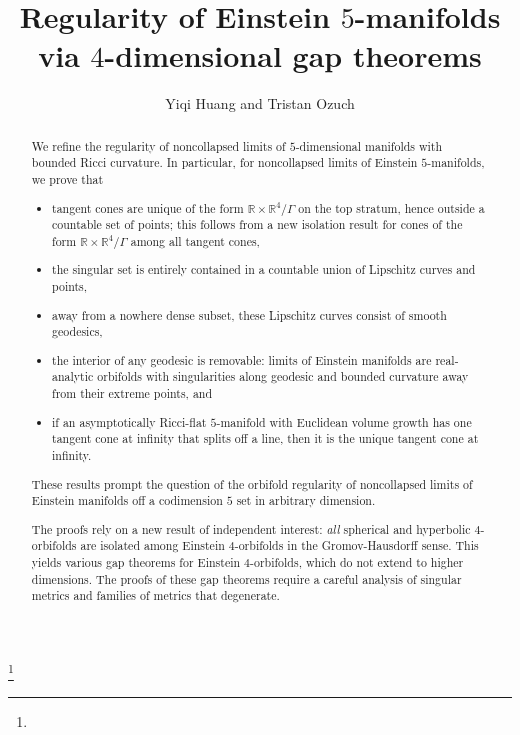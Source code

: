 \documentclass[11pt,reqno]{amsart}
\numberwithin{equation}{section}
\theoremstyle{definition}
\theoremstyle{remark}
\begin{document}
\thanks{}

\title[]{Regularity of Einstein $5$-manifolds via $4$-dimensional gap theorems}



\author{Yiqi Huang and Tristan Ozuch}
\address{Department of Mathematics, MIT, 77 Massachusetts Avenue, Cambridge, MA 02139-4307, USA}






\vspace{-0.3cm}
        


\begin{abstract}
    We refine the regularity of noncollapsed limits of $5$-dimensional manifolds with bounded Ricci curvature. In particular, for noncollapsed limits of Einstein $5$-manifolds, we prove that
    \begin{itemize}
        \item tangent cones are unique of the form $\mathbb{R}\times\mathbb{R}^4/\Gamma$ on the top stratum, hence outside a countable set of points; this follows from a new isolation result for cones of the form $\mathbb{R}\times\mathbb{R}^4/\Gamma$ among all tangent cones,
        \item the singular set is entirely contained in a countable union of Lipschitz curves and points,
        \item away from a nowhere dense subset, these Lipschitz curves consist of smooth geodesics,
        \item the interior of any geodesic is removable: limits of Einstein manifolds are real-analytic orbifolds with singularities along geodesic and bounded curvature away from their extreme points, and
        \item if an asymptotically Ricci-flat $5$-manifold with Euclidean volume growth has one tangent cone at infinity that splits off a line, then it is the unique tangent cone at infinity.
    \end{itemize}
    These results prompt the question of the orbifold regularity of noncollapsed limits of Einstein manifolds off a codimension $5$ set in arbitrary dimension. 
    
    The proofs rely on a new result of independent interest: \textit{all} spherical and hyperbolic $4$-orbifolds are isolated among Einstein $4$-orbifolds in the Gromov-Hausdorff sense. This yields various gap theorems for Einstein $4$-orbifolds, which do not extend to higher dimensions. The proofs of these gap theorems require a careful analysis of singular metrics and families of metrics that degenerate.
\end{abstract}
\end{document}
